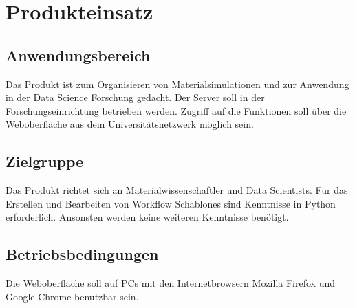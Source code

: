 \chapter{Produkteinsatz}
\section{Anwendungsbereich}
Das Produkt ist zum Organisieren von Materialsimulationen und zur Anwendung in der Data Science Forschung gedacht.
Der Server soll in der Forschungseinrichtung betrieben werden.
Zugriff auf die Funktionen soll über die Weboberfläche aus dem Universitätsnetzwerk möglich sein.

\section{Zielgruppe}
Das Produkt richtet sich an Materialwissenschaftler und \glspl{Data Scientist}.
Für das Erstellen und Bearbeiten von \glspl{Workflow Schablone} sind Kenntnisse in \gls{Python} erforderlich. Ansonsten werden keine weiteren Kenntnisse benötigt.

\section{Betriebsbedingungen}
Die Weboberfläche soll auf PCs mit den Internetbrowsern Mozilla Firefox und Google Chrome benutzbar sein.
